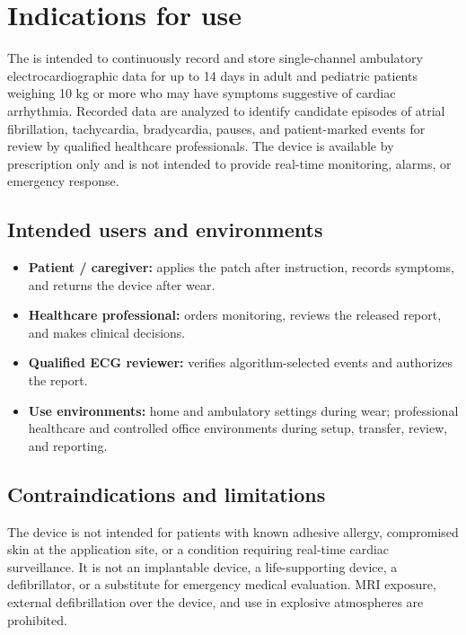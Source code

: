 \section{Indications for use}

\begin{keybox}[title={\bfseries Proposed indications for use}]
The \DeviceName{} is intended to continuously record and store single-channel ambulatory electrocardiographic data for up to 14 days in adult and pediatric patients weighing 10 kg or more who may have symptoms suggestive of cardiac arrhythmia. Recorded data are analyzed to identify candidate episodes of atrial fibrillation, tachycardia, bradycardia, pauses, and patient-marked events for review by qualified healthcare professionals. The device is available by prescription only and is not intended to provide real-time monitoring, alarms, or emergency response.
\end{keybox}

\subsection{Intended users and environments}
\begin{itemize}
  \item \textbf{Patient / caregiver:} applies the patch after instruction, records symptoms, and returns the device after wear.
  \item \textbf{Healthcare professional:} orders monitoring, reviews the released report, and makes clinical decisions.
  \item \textbf{Qualified ECG reviewer:} verifies algorithm-selected events and authorizes the report.
  \item \textbf{Use environments:} home and ambulatory settings during wear; professional healthcare and controlled office environments during setup, transfer, review, and reporting.
\end{itemize}

\subsection{Contraindications and limitations}
The device is not intended for patients with known adhesive allergy, compromised skin at the application site, or a condition requiring real-time cardiac surveillance. It is not an implantable device, a life-supporting device, a defibrillator, or a substitute for emergency medical evaluation. MRI exposure, external defibrillation over the device, and use in explosive atmospheres are prohibited.

